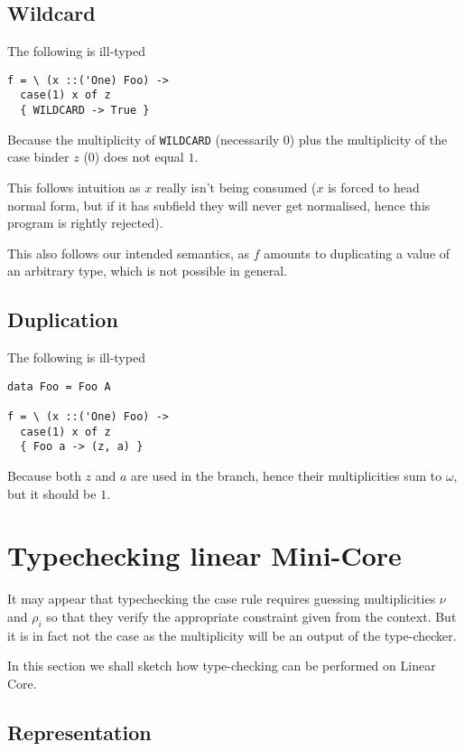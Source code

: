 \documentclass{article}
\begin{document}
\subsection{Wildcard}

The following is ill-typed
\begin{verbatim}
f = \ (x ::('One) Foo) ->
  case(1) x of z
  { WILDCARD -> True }
\end{verbatim}
Because the multiplicity of \verb+WILDCARD+ (necessarily $0$) plus the
multiplicity of the case binder $z$ ($0$) does not equal $1$.

This follows intuition as $x$ really isn't being consumed ($x$ is forced
to head normal form, but if it has subfield they will never get
normalised, hence this program is rightly rejected).

This also follows our intended semantics, as $f$ amounts to
duplicating a value of an arbitrary type, which is not possible in
general.

\subsection{Duplication}

The following is ill-typed
\begin{verbatim}
data Foo = Foo A

f = \ (x ::('One) Foo) ->
  case(1) x of z
  { Foo a -> (z, a) }
\end{verbatim}
Because both $z$ and $a$ are used in the branch, hence their
multiplicities sum to $ω$, but it should be $1$.

\section{Typechecking linear Mini-Core}

\newcommand{\type}[1]{\mathsf{type}(#1)}
\newcommand{\mult}[1]{\mathsf{mult}(#1)}
\newcommand{\typeof}[1]{\mathsf{lint}(#1)}

It may appear that typechecking the case rule requires guessing
multiplicities $ν$ and $ρ_i$ so that they verify the appropriate
constraint given from the context. But it is in fact not the case as
the multiplicity will be an output of the type-checker.

In this section we shall sketch how type-checking can be performed on
Linear Core.

\subsection{Representation}
\end{document}
